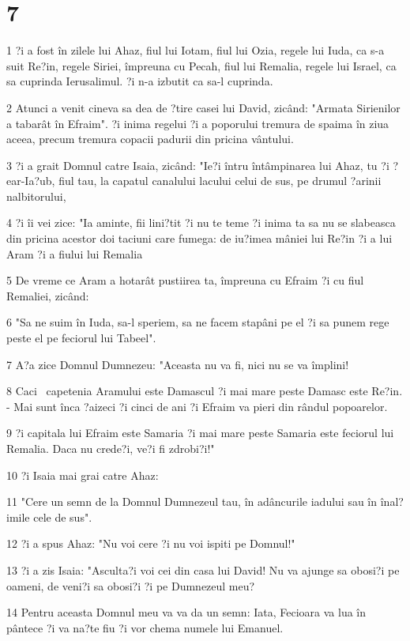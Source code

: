 \chapter{7}

\par 1 ?i a fost în zilele lui Ahaz, fiul lui Iotam, fiul lui Ozia, regele lui Iuda, ca s-a suit Re?in, regele Siriei, împreuna cu Pecah, fiul lui Remalia, regele lui Israel, ca sa cuprinda Ierusalimul. ?i n-a izbutit ca sa-l cuprinda.
\par 2 Atunci a venit cineva sa dea de ?tire casei lui David, zicând: "Armata Sirienilor a tabarât în Efraim". ?i inima regelui ?i a poporului tremura de spaima în ziua aceea, precum tremura copacii padurii din pricina vântului.
\par 3 ?i a grait Domnul catre Isaia, zicând: "Ie?i întru întâmpinarea lui Ahaz, tu ?i ?ear-Ia?ub, fiul tau, la capatul canalului lacului celui de sus, pe drumul ?arinii nalbitorului,
\par 4 ?i îi vei zice: "Ia aminte, fii lini?tit ?i nu te teme ?i inima ta sa nu se slabeasca din pricina acestor doi taciuni care fumega: de iu?imea mâniei lui Re?in ?i a lui Aram ?i a fiului lui Remalia
\par 5 De vreme ce Aram a hotarât pustiirea ta, împreuna cu Efraim ?i cu fiul Remaliei, zicând:
\par 6 "Sa ne suim în Iuda, sa-l speriem, sa ne facem stapâni pe el ?i sa punem rege peste el pe feciorul lui Tabeel".
\par 7 A?a zice Domnul Dumnezeu: "Aceasta nu va fi, nici nu se va împlini!
\par 8 Caci  capetenia Aramului este Damascul ?i mai mare peste Damasc este Re?in. - Mai sunt înca ?aizeci ?i cinci de ani ?i Efraim va pieri din rândul popoarelor.
\par 9 ?i capitala lui Efraim este Samaria ?i mai mare peste Samaria este feciorul lui Remalia. Daca nu crede?i, ve?i fi zdrobi?i!"
\par 10 ?i Isaia mai grai catre Ahaz:
\par 11 "Cere un semn de la Domnul Dumnezeul tau, în adâncurile iadului sau în înal?imile cele de sus".
\par 12 ?i a spus Ahaz: "Nu voi cere ?i nu voi ispiti pe Domnul!"
\par 13 ?i a zis Isaia: "Asculta?i voi cei din casa lui David! Nu va ajunge sa obosi?i pe oameni, de veni?i sa obosi?i ?i pe Dumnezeul meu?
\par 14 Pentru aceasta Domnul meu va va da un semn: Iata, Fecioara va lua în pântece ?i va na?te fiu ?i vor chema numele lui Emanuel.

